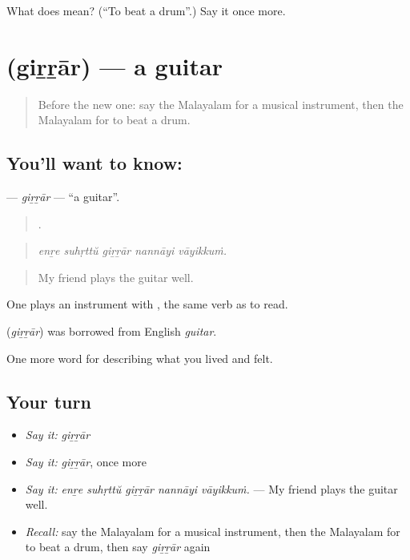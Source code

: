 \begin{tcolorbox}[breakable,colback=teal!4,colframe=teal!35!black,title={Before you move on}]
What does  mean? (\textquotedblleft{}To beat a drum\textquotedblright{}.) Say it once more.
\end{tcolorbox}
\section[\texorpdfstring{\ml{ഗിറ്റാർ} (giṟṟār)}{ഗിറ്റാർ (giṟṟār)}]{ (giṟṟār) — a guitar}

\label{lesson:ML-C561-girrar}



\begin{quote}
Before the new one: say the Malayalam for a musical instrument, then the Malayalam for to beat a drum.
\end{quote}

\subsection*{You'll want to know: }
\textbf{} — \emph{giṟṟār} — \textquotedblleft{}a guitar\textquotedblright{}.

\begin{quote}
    .
\end{quote}

\begin{quote}
\emph{enṟe suhṛttŭ giṟṟār nannāyi vāyikkuṁ.}
\end{quote}

\begin{quote}
My friend plays the guitar well.
\end{quote}

One plays an instrument with , the same verb as to read.

\begin{cousinweb}
\textbf{} (\emph{giṟṟār}) was borrowed from English \emph{guitar}.
\end{cousinweb}

\begin{grammarlens}[title={What you've built}]
One more word for describing what you lived and felt.
\end{grammarlens}

\subsection*{Your turn}
\begin{itemize}
\raggedright
  \item \emph{Say it:} \emph{giṟṟār}
  \item \emph{Say it:} \emph{giṟṟār}, once more
  \item \emph{Say it:} \emph{enṟe suhṛttŭ giṟṟār nannāyi vāyikkuṁ.} — My friend plays the guitar well.
  \item \emph{Recall:} say the Malayalam for a musical instrument, then the Malayalam for to beat a drum, then say \emph{giṟṟār} again
\end{itemize}

